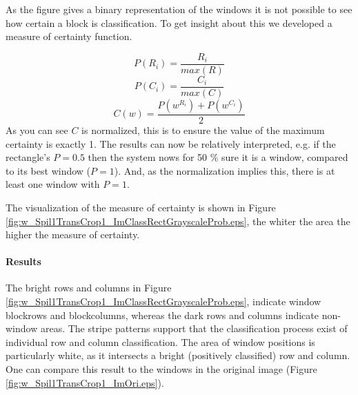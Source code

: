 As the figure gives a binary representation of the windows it is not possible
to see how certain a block is classification.
To get insight about this we developed a measure of certainty function.

\[P(R_i) = \frac{R_i}{max(R)}\]
\[P(C_i) = \frac{C_i}{max(C)}\]
\[C(w) = \frac{P(w^{R_i}) + P(w^{C_i})}{2}\]
As you can see $C$ is normalized, this is to ensure the value of the maximum
certainty is exactly 1. The results can now be relatively interpreted, e.g. if the rectangle's $P=0.5$
then the system nows for 50 \% sure it is a window, compared to its best window ($P=1$). 
And, as the normalization implies this, there is at least one window with $P=1$. 

The visualization of the measure of certainty is shown in Figure
\ref{fig:w_Spil1TransCrop1_ImClassRectGrayscaleProb.eps},  
the whiter the area the higher the measure of certainty.



\newpage
\paragraph{Results} %
\clearpage

The bright rows and columns in Figure
\ref{fig:w_Spil1TransCrop1_ImClassRectGrayscaleProb.eps},  indicate window
blockrows and blockcolumns, whereas the dark rows and columns indicate
non-window areas.
The stripe patterns support that the classification process exist of individual
row and column classification.
The area of window positions is particularly white, as it 
intersects a bright (positively classified) row and column.
One can compare this result to the windows in the original image 
(Figure \ref{fig:w_Spil1TransCrop1_ImOri.eps}).



